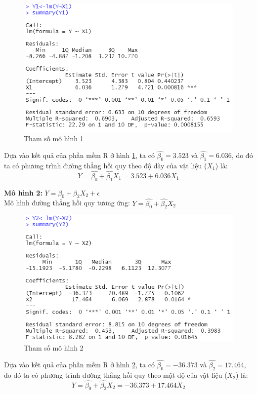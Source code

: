 \documentclass[a4paper]{article}
\theoremstyle{nonumberplain}
\begin{document}
\begin{figure}[h!]
	\centering
	\includegraphics[scale =0.9]{bai2_1i.PNG}
	\caption{Tham số mô hình 1}
	\label{ex2:model:11}
\end{figure}

Dựa vào kết quả của phần mềm R ở hình \ref{ex2:model:11}, ta có $\hat{\beta_0} = 3.523$ và $\hat{\beta_1} = 6.036$, do đó ta có phương trình đường thẳng hồi quy theo độ dày của vật liệu ($X_1$) là:
\[Y = \hat{\beta_0} + \hat{\beta_1} X_1 = 3.523 + 6.036 X_1\]


\textbf{Mô hình 2:} $Y= \beta_0 + \beta_2 X_2 + \epsilon$\\
Mô hình đường thẳng hồi quy tương ứng: $Y= \hat{\beta_0} + \hat{\beta_2} X_2$

\begin{figure}[h!]
	\centering
	\includegraphics[scale =0.9]{bai2_1ii.PNG} 
	\caption{Tham số mô hình 2}
	\label{ex2:model:12}
\end{figure}

Dựa vào kết quả của phần mềm R ở hình \ref{ex2:model:12}, ta có $\hat{\beta_0} = -36.373$ và $\hat{\beta_2} = 17.464$, do đó ta có phương trình đường thẳng hồi quy theo mật độ của vật liệu ($X_2$) là:
\[Y = \hat{\beta_0} + \hat{\beta_2} X_2 = -36.373 + 17.464 X_2\]
\end{document}
